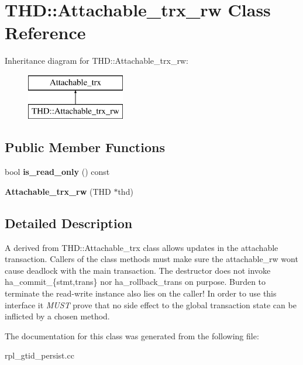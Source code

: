 \hypertarget{classTHD_1_1Attachable__trx__rw}{}\section{T\+HD\+:\+:Attachable\+\_\+trx\+\_\+rw Class Reference}
\label{classTHD_1_1Attachable__trx__rw}
Inheritance diagram for T\+HD\+:\+:Attachable\+\_\+trx\+\_\+rw\+:\begin{figure}[H]
\begin{center}
\leavevmode
\includegraphics[height=2.000000cm]{classTHD_1_1Attachable__trx__rw}
\end{center}
\end{figure}
\subsection*{Public Member Functions}
\begin{DoxyCompactItemize}
\item 
\mbox{\label{classTHD_1_1Attachable__trx__rw_a6a043fc03c3fc818a651775d1329d220}} 
bool {\bfseries is\+\_\+read\+\_\+only} () const
\item 
\mbox{\label{classTHD_1_1Attachable__trx__rw_af20705c08a222ff743432285df375913}} 
{\bfseries Attachable\+\_\+trx\+\_\+rw} (T\+HD $\ast$thd)
\end{DoxyCompactItemize}


\subsection{Detailed Description}
A derived from T\+H\+D\+::\+Attachable\+\_\+trx class allows updates in the attachable transaction. Callers of the class methods must make sure the attachable\+\_\+rw won\textquotesingle{}t cause deadlock with the main transaction. The destructor does not invoke ha\+\_\+commit\+\_\+\{stmt,trans\} nor ha\+\_\+rollback\+\_\+trans on purpose. Burden to terminate the read-\/write instance also lies on the caller! In order to use this interface it {\itshape M\+U\+ST} prove that no side effect to the global transaction state can be inflicted by a chosen method. 

The documentation for this class was generated from the following file\+:\begin{DoxyCompactItemize}
\item 
rpl\+\_\+gtid\+\_\+persist.\+cc\end{DoxyCompactItemize}
